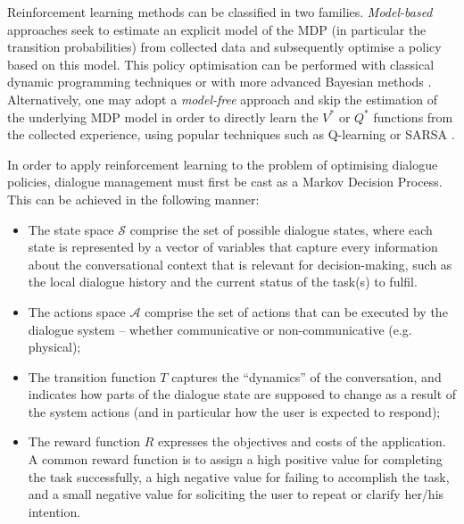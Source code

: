 Reinforcement learning methods can be classified in two families.  \textit{Model-based} approaches seek to estimate an explicit model of the MDP (in particular the transition probabilities) from collected data and subsequently optimise a policy based on this model.  This policy optimisation can be performed with classical dynamic programming techniques \citep{Bertsekas:1996} or with more advanced Bayesian methods \citep{DeardenFA99}.  Alternatively, one may adopt a \textit{model-free} approach and skip the estimation of the underlying MDP model in order to directly learn the $V^*$ or $Q^*$ functions from the collected experience, using popular techniques such as Q-learning \citep{watkins92} or SARSA \citep{rummery:phd95}. 

In order to apply reinforcement learning to the problem of optimising dialogue policies, dialogue management must  first be cast as a Markov Decision Process.  This can be achieved in the following manner: 
\begin{itemize}
\item The state space $\mathcal{S}$ comprise the set of possible dialogue states, where each state is represented by a vector of variables that capture every information about the conversational context that is relevant for decision-making, such as the local dialogue history and the current status of the task(s) to fulfil.  
\item The actions space $\mathcal{A}$ comprise the set of actions that can be executed by the dialogue system -- whether communicative or non-communicative (e.g. physical); 
\item The transition function $T$ captures the ``dynamics'' of the conversation, and indicates how parts of the dialogue state are supposed to change as a result of the system actions (and in particular how the user is expected to respond);
\item The reward function $R$ expresses the objectives and costs of the application. A common reward function is to assign a high positive value for completing the task successfully, a high negative value for failing to accomplish the task, and a small negative value for soliciting the user to repeat or clarify her/his intention.  
\end{itemize}

